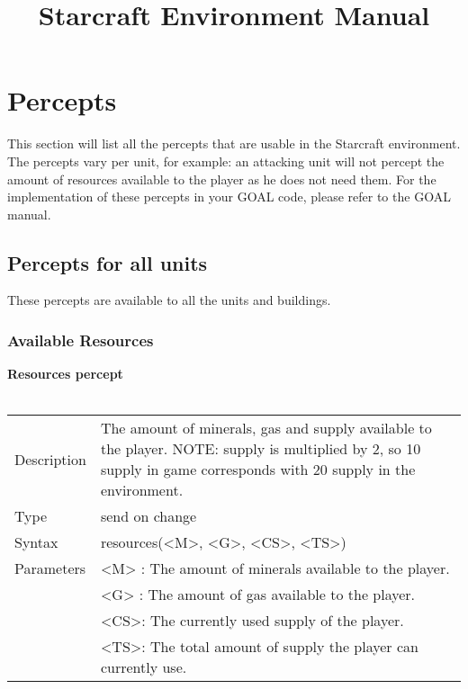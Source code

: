 \documentclass[english,11pt]{report}
\title{Starcraft Environment Manual}
\begin{document}
\maketitle
\tableofcontents

\chapter{Percepts}

This section will list all the percepts that are usable in the Starcraft environment. The percepts vary per unit, for example: an attacking unit will not percept the amount of resources available to the player as he does not need them. For the implementation of these percepts in your GOAL code, please refer to the GOAL manual.

\newpage
\section{Percepts for all units}
These percepts are available to all the units and buildings.

\subsection{Available Resources}
\textbf{Resources percept}\\
\\
\begin{tabularx}{\textwidth}{lX}
 Description & The amount of minerals, gas and supply available to the player. NOTE: supply is multiplied by 2, so 10 supply in game corresponds with 20 supply in the environment. \\
 Type & send on change \\
 Syntax & resources(<M>, <G>, <CS>, <TS>) \\
 Parameters & <M> : The amount of minerals available to the player. \\
            & <G> : The amount of gas available to the player. \\
            & <CS>: The currently used supply of the player. \\
            & <TS>: The total amount of supply the player can currently use.
\end{tabularx}\\
\\
\end{document}
